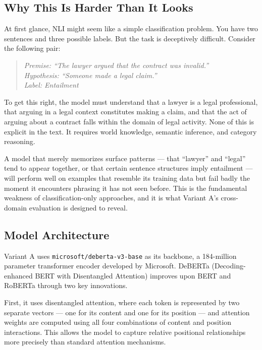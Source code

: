 \subsection{Why This Is Harder Than It Looks}

At first glance, NLI might seem like a simple classification problem.
You have two sentences and three possible labels. But the task is
deceptively difficult. Consider the following pair:

\begin{quote}
\textit{Premise: ``The lawyer argued that the contract was invalid.''} \\
\textit{Hypothesis: ``Someone made a legal claim.''} \\
\textit{Label: Entailment}
\end{quote}

To get this right, the model must understand that a lawyer is a legal
professional, that arguing in a legal context constitutes making a
claim, and that the act of arguing about a contract falls within the
domain of legal activity. None of this is explicit in the text. It
requires world knowledge, semantic inference, and category reasoning.

A model that merely memorizes surface patterns --- that ``lawyer'' and
``legal'' tend to appear together, or that certain sentence structures
imply entailment --- will perform well on examples that resemble its
training data but fail badly the moment it encounters phrasing it has
not seen before. This is the fundamental weakness of
classification-only approaches, and it is what Variant A's
cross-domain evaluation is designed to reveal.

\subsection{Model Architecture}

Variant A uses \texttt{microsoft/deberta-v3-base} as its backbone, a
184-million parameter transformer encoder developed by Microsoft.
DeBERTa (Decoding-enhanced BERT with Disentangled Attention) improves
upon BERT and RoBERTa through two key innovations.

First, it uses disentangled attention, where each token is represented
by two separate vectors --- one for its content and one for its
position --- and attention weights are computed using all four
combinations of content and position interactions. This allows the
model to capture relative positional relationships more precisely than
standard attention mechanisms.


